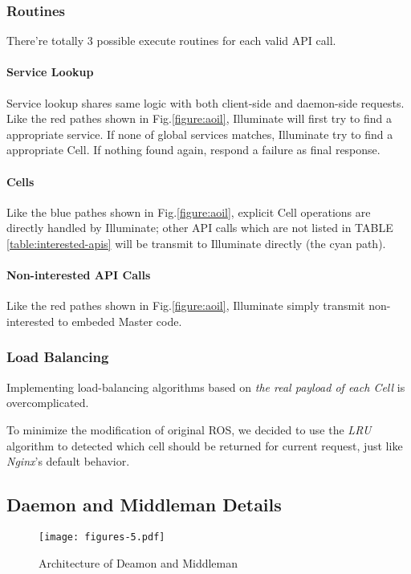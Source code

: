 \subsubsection{Routines}
There're totally 3 possible execute routines for each valid API call.

\paragraph{Service Lookup}
Service lookup shares same logic with both client-side and daemon-side requests.
Like the red pathes shown in Fig.\ref{figure:aoil}, Illuminate will first try 
to find a appropriate service. If none of global services matches, 
Illuminate try to find a appropriate Cell.
If nothing found again, respond a failure as final response.
 
\paragraph{Cells}
Like the blue pathes shown in Fig.\ref{figure:aoil}, explicit Cell operations
are directly handled by Illuminate; other API calls which are not listed in
TABLE \ref{table:interested-apis} will be transmit to
Illuminate directly (the cyan path).

\paragraph{Non-interested API Calls}
Like the red pathes shown in Fig.\ref{figure:aoil},
Illuminate simply transmit non-interested to embeded Master code.

\subsubsection{Load Balancing}
Implementing load-balancing algorithms based on \emph{the real payload of each Cell} is overcomplicated.

To minimize the modification of original ROS, we decided to use the \emph{LRU} algorithm to detected which cell should be returned for current request, just like \emph{Nginx}'s default behavior.


\subsection{Daemon and Middleman Details}

\begin{figure}[!t]
\centering
\texttt{[image: figures-5.pdf]}
\caption{Architecture of Deamon and Middleman}
\label{figure:aodm}
\end{figure}

